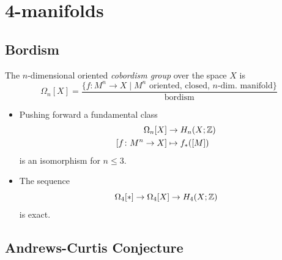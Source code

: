 \chapter{4-manifolds}

\section{Bordism}

\begin{definition}
	The $n$-dimensional oriented \textit{cobordism group}
	over the space $X$ is
	\begin{equation*}
		\Omega_{n}[X] =
			\frac{ \{ f \colon M^{n} \rightarrow X \mid M^n \textrm{ oriented, closed, } 
			n\textrm{-dim. manifold} \}}{\textrm{bordism}}
	\end{equation*}
\end{definition}

\begin{proposition}
	\begin{itemize}
		\item Pushing forward a fundamental class
		\begin{align*}
			\Omega_n [X] & \rightarrow H_{n}(X ; \mathbb{Z}) \\ 
			[f \colon M^{n} \rightarrow X] & \mapsto f_{*}([M])
		\end{align*}
		is an isomorphism for $n \le 3$.
		
		\item The sequence
		\begin{equation*}
			\Omega_{4}[\ast] \rightarrow \Omega_{4}[X] \rightarrow H_{4}(X ; \mathbb{Z})
		\end{equation*}
		is exact.
	\end{itemize}
\end{proposition}


\section{Andrews-Curtis Conjecture}

\citep{SCP4}

